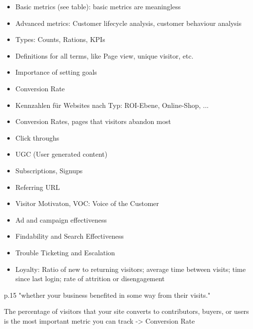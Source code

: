 \begin{itemize}
\item Basic metrics (see table): basic metrics are meaningless
\item Advanced metrics: Customer lifecycle analysis, customer behaviour analysis
\end{itemize}


\begin{itemize}
\item Types: Counts, Rations, KPIs
\item Definitions for all terms, like Page view, unique visitor, etc.
\end{itemize}




\begin{itemize}
\item Importance of setting goals
\item Conversion Rate
\item Kennzahlen für Websites nach Typ: ROI-Ebene, Online-Shop, ...
\end{itemize}





\begin{itemize}
\item Conversion Rates, pages that visitors abandon most
\item Click throughs
\item UGC (User generated content)
\item Subscriptions, Signups
\item Referring URL
\item Visitor Motivaton, VOC: Voice of the Customer
\item Ad and campaign effectiveness
\item Findability and Search Effectiveness
\item Trouble Ticketing and Escalation
\item Loyalty: Ratio of new to returning visitors; average time between visits; time since last login; rate of attrition or disengagement
\end{itemize}

p.15 "whether your business benefited in some way from their visits."

The percentage of visitors that your site converts to contributors, buyers, or users is the most important metric you can track -> Conversion Rate

